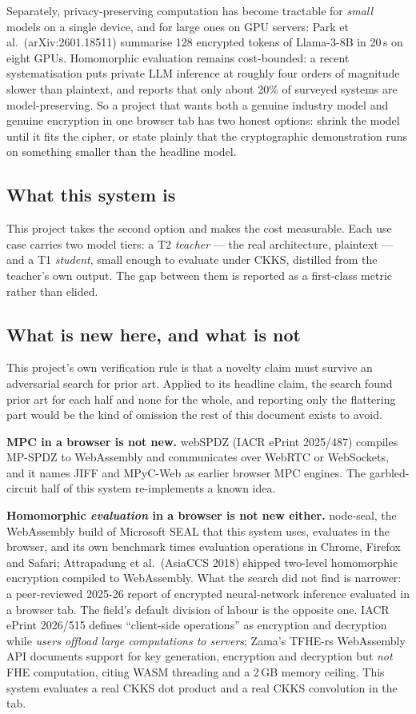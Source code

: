 \documentclass[11pt,a4paper]{article}
\begin{document}
Separately, privacy-preserving computation has become tractable for \emph{small} models on a single
device, and for large ones on GPU servers: Park et al.\ (arXiv:2601.18511) summarise 128 encrypted
tokens of Llama-3-8B in 20\,s on eight GPUs. Homomorphic evaluation remains cost-bounded: a recent
systematisation puts private LLM inference at roughly four orders of magnitude slower than plaintext,
and reports that only about 20\% of surveyed systems are model-preserving. So a project that wants
both a genuine industry model and genuine encryption in one browser tab has two honest options:
shrink the model until it fits the cipher, or state plainly that the cryptographic demonstration runs
on something smaller than the headline model.

\subsection{What this system is}
This project takes the second option and makes the cost measurable. Each use case carries two model
tiers: a T2 \emph{teacher} --- the real architecture, plaintext --- and a T1 \emph{student}, small
enough to evaluate under CKKS, distilled from the teacher's own output. The gap between them is
reported as a first-class metric rather than elided.

\subsection{What is new here, and what is not}
This project's own verification rule is that a novelty claim must survive an adversarial search for
prior art. Applied to its headline claim, the search found prior art for each half and none for the
whole, and reporting only the flattering part would be the kind of omission the rest of this document
exists to avoid.

\textbf{MPC in a browser is not new.} webSPDZ (IACR ePrint 2025/487) compiles MP-SPDZ to WebAssembly
and communicates over WebRTC or WebSockets, and it names JIFF and MPyC-Web as earlier browser MPC
engines. The garbled-circuit half of this system re-implements a known idea.

\textbf{Homomorphic \emph{evaluation} in a browser is not new either.} node-seal, the WebAssembly
build of Microsoft SEAL that this system uses, evaluates in the browser, and its own benchmark times
evaluation operations in Chrome, Firefox and Safari; Attrapadung et al.\ (AsiaCCS 2018) shipped
two-level homomorphic encryption compiled to WebAssembly. What the search did not find is narrower: a
peer-reviewed 2025-26 report of encrypted neural-network inference evaluated in a browser tab. The
field's default division of labour is the opposite one. IACR ePrint 2026/515 defines ``client-side
operations'' as encryption and decryption while \emph{users offload large computations to servers};
Zama's TFHE-rs WebAssembly API documents support for key generation, encryption and decryption but
\emph{not} FHE computation, citing WASM threading and a 2\,GB memory ceiling. This system evaluates a
real CKKS dot product and a real CKKS convolution in the tab.
\end{document}
